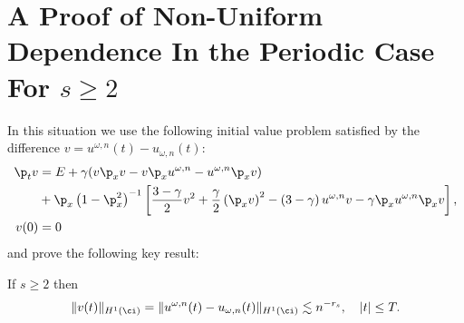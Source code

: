 	\section{A Proof of Non-Uniform Dependence In the Periodic Case For $s\ge 2$}
	In this situation we use the following initial value problem
	satisfied  by the difference
	$
	v=
		u^{\omega, n}(t) 
				- 
				u_{\omega, n}(t)
				$:
	\begin{align}
	\label{v-eq}
					\p_t v 
					& = E + \gamma(v \p_x v - v \p_x u^{\omega,n} - u^{\omega,n} \p_x v) 
					\\
					& + \p_x\left( 1 - \p_x^2 \right)^{-1} \left[ \frac{3-
					\gamma}{2}v^2 + \frac{\gamma}{2}\left( \p_x v \right)^2 - \left(
					3 - \gamma \right)u^{\omega,n} v -
					\gamma \p_x u^{\omega,n} \p_x v \right],
					\notag
					\\
					v(0) & =0
					\label{v-data}
			\end{align}
and prove the following key result:
%
\begin{lemma}
	\label{lem:bound_for_difference-of-approx-and-actual-soln}
If $s \ge 2$ then
			\begin{equation} 
				\|
				v(t)
				\|_{H^1(\ci)}
				=
				\label{differ-H1-est} 
				\|
				u^{\omega, n}(t) 
				- 
				u_{\omega, n}(t)
				\|_{H^1(\ci)}
				\lesssim 
				n^{-r_s}, 
				\quad
				|t| \le T.
			\end{equation}
			\end{lemma}
%
